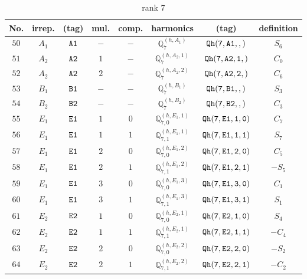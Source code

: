 \documentclass[fleqn,8pt]{jsarticle}
\begin{document}
\begin{table}[ht!]
\begin{center}
\caption{rank 7}
\renewcommand{\arraystretch}{1.3}
\begin{tabular}{cccccccc} \hline \hline
No. & irrep. & (tag) & mul. & comp. & harmonics & (tag) & definition \\ \hline
$ 50 $ & $ A_{1} $ & $ {\tt A1} $ & $ - $ & $ - $ & $ \mathbb{Q}_{7}^{(h,A_{1})} $ & $ {\tt Qh(7,A1,,)} $ & $ S_{6} $ \\
$ 51 $ & $ A_{2} $ & $ {\tt A2} $ & $ 1 $ & $ - $ & $ \mathbb{Q}_{7}^{(h,A_{2},1)} $ & $ {\tt Qh(7,A2,1,)} $ & $ C_{0} $ \\
$ 52 $ & $ A_{2} $ & $ {\tt A2} $ & $ 2 $ & $ - $ & $ \mathbb{Q}_{7}^{(h,A_{2},2)} $ & $ {\tt Qh(7,A2,2,)} $ & $ C_{6} $ \\
$ 53 $ & $ B_{1} $ & $ {\tt B1} $ & $ - $ & $ - $ & $ \mathbb{Q}_{7}^{(h,B_{1})} $ & $ {\tt Qh(7,B1,,)} $ & $ S_{3} $ \\
$ 54 $ & $ B_{2} $ & $ {\tt B2} $ & $ - $ & $ - $ & $ \mathbb{Q}_{7}^{(h,B_{2})} $ & $ {\tt Qh(7,B2,,)} $ & $ C_{3} $ \\
$ 55 $ & $ E_{1} $ & $ {\tt E1} $ & $ 1 $ & $ 0 $ & $ \mathbb{Q}_{7,0}^{(h,E_{1},1)} $ & $ {\tt Qh(7,E1,1,0)} $ & $ C_{7} $ \\
$ 56 $ & $ E_{1} $ & $ {\tt E1} $ & $ 1 $ & $ 1 $ & $ \mathbb{Q}_{7,1}^{(h,E_{1},1)} $ & $ {\tt Qh(7,E1,1,1)} $ & $ S_{7} $ \\
$ 57 $ & $ E_{1} $ & $ {\tt E1} $ & $ 2 $ & $ 0 $ & $ \mathbb{Q}_{7,0}^{(h,E_{1},2)} $ & $ {\tt Qh(7,E1,2,0)} $ & $ C_{5} $ \\
$ 58 $ & $ E_{1} $ & $ {\tt E1} $ & $ 2 $ & $ 1 $ & $ \mathbb{Q}_{7,1}^{(h,E_{1},2)} $ & $ {\tt Qh(7,E1,2,1)} $ & $ - S_{5} $ \\
$ 59 $ & $ E_{1} $ & $ {\tt E1} $ & $ 3 $ & $ 0 $ & $ \mathbb{Q}_{7,0}^{(h,E_{1},3)} $ & $ {\tt Qh(7,E1,3,0)} $ & $ C_{1} $ \\
$ 60 $ & $ E_{1} $ & $ {\tt E1} $ & $ 3 $ & $ 1 $ & $ \mathbb{Q}_{7,1}^{(h,E_{1},3)} $ & $ {\tt Qh(7,E1,3,1)} $ & $ S_{1} $ \\
$ 61 $ & $ E_{2} $ & $ {\tt E2} $ & $ 1 $ & $ 0 $ & $ \mathbb{Q}_{7,0}^{(h,E_{2},1)} $ & $ {\tt Qh(7,E2,1,0)} $ & $ S_{4} $ \\
$ 62 $ & $ E_{2} $ & $ {\tt E2} $ & $ 1 $ & $ 1 $ & $ \mathbb{Q}_{7,1}^{(h,E_{2},1)} $ & $ {\tt Qh(7,E2,1,1)} $ & $ - C_{4} $ \\
$ 63 $ & $ E_{2} $ & $ {\tt E2} $ & $ 2 $ & $ 0 $ & $ \mathbb{Q}_{7,0}^{(h,E_{2},2)} $ & $ {\tt Qh(7,E2,2,0)} $ & $ - S_{2} $ \\
$ 64 $ & $ E_{2} $ & $ {\tt E2} $ & $ 2 $ & $ 1 $ & $ \mathbb{Q}_{7,1}^{(h,E_{2},2)} $ & $ {\tt Qh(7,E2,2,1)} $ & $ - C_{2} $ \\
 \hline \hline
\end{tabular}
\end{center}
\end{table}
\end{document}
